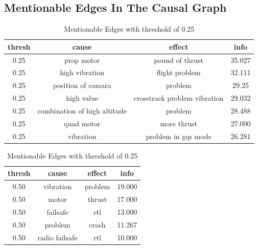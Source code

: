 \subsection{Mentionable Edges In The Causal Graph}\label{subsec:information-question}
\begin{table}
    \begin{center}
        \begin{tabular}[t]{||c c c c||}
            \hline
            thresh & cause                        & effect                       & info \\ [0.5ex]
            \hline\hline
            0.25   & prop motor                   & pound of thrust              & 35.027 \\ \hline
            0.25   & high vibration               & flight problem               & 32.111 \\ \hline
            0.25   & position of camara           & problem                      & 29.25  \\ \hline
            0.25   & high value                   & crosstrack problem vibration & 29.032 \\ \hline
            0.25   & combination of high altitude & problem                      & 28.488 \\ \hline
            0.25   & quad motor                   & more thrust                  & 27.000 \\ \hline
            0.25   & vibration                    & problem in gqs mode          & 26.281 \\ \hline
        \end{tabular}
        \caption{Mentionable Edges with threshold of 0.25}\label{tab:information-score-25}
        \begin{tabular}[t]{||c c c c||}
            \hline
            thresh & cause          & effect  & info \\ [0.5ex]
            \hline\hline
            0.50   & vibration      & problem & 19.000             \\ \hline
            0.50   & motor          & thrust  & 17.000             \\ \hline
            0.50   & failsafe       & rtl     & 13.000             \\ \hline
            0.50   & problem        & crash   & 11.267             \\ \hline
            0.50   & radio failsafe & rtl     & 10.000             \\ \hline
        \end{tabular}

\end{center}
\end{table}
